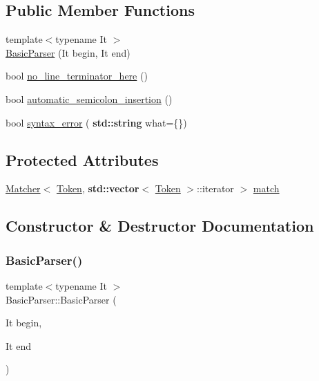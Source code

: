 \subsection*{Public Member Functions}
\begin{DoxyCompactItemize}
\item 
{\footnotesize template$<$typename It $>$ }\\\hyperlink{class_basic_parser_a3eb421ec331867303a3c300a1265fb3e}{Basic\+Parser} (It begin, It end)
\item 
bool \hyperlink{class_basic_parser_a930e162bca752f81e0e8aae79d9b0c2c}{no\+\_\+line\+\_\+terminator\+\_\+here} ()
\item 
bool \hyperlink{class_basic_parser_ad15b20b3c4078b04b4443517bc6adcf3}{automatic\+\_\+semicolon\+\_\+insertion} ()
\item 
bool \hyperlink{class_basic_parser_a9f6e198247d7c86ee67cce6b7bef97a8}{syntax\+\_\+error} (\textbf{ std\+::string} what=\{\})
\end{DoxyCompactItemize}
\subsection*{Protected Attributes}
\begin{DoxyCompactItemize}
\item 
\hyperlink{class_matcher}{Matcher}$<$ \hyperlink{class_token}{Token}, \textbf{ std\+::vector}$<$ \hyperlink{class_token}{Token} $>$\+::iterator $>$ \hyperlink{class_basic_parser_afab2b9cbb6c9ef06d3e15054089ea6d9}{match}
\end{DoxyCompactItemize}


\subsection{Constructor \& Destructor Documentation}
\mbox{\label{class_basic_parser_a3eb421ec331867303a3c300a1265fb3e}} 
\subsubsection{\texorpdfstring{Basic\+Parser()}{BasicParser()}}
{\footnotesize\ttfamily template$<$typename It $>$ \\
Basic\+Parser\+::\+Basic\+Parser (\begin{DoxyParamCaption}\item[{It}]{begin,  }\item[{It}]{end }\end{DoxyParamCaption})\hspace{0.3cm}{\ttfamily [inline]}}



